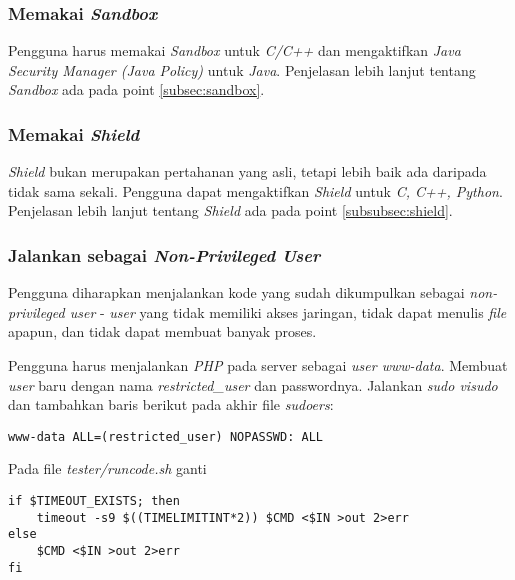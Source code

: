 \subsubsection{Memakai \textit{Sandbox}}
\label{subsubsec:memakai_sandbox}
Pengguna harus memakai \textit{Sandbox} untuk \textit{C/C++} dan mengaktifkan \textit{Java Security Manager (Java Policy)} untuk \textit{Java}. Penjelasan lebih lanjut tentang \textit{Sandbox} ada pada point \ref{subsec:sandbox}.

\subsubsection{Memakai \textit{Shield}}
\label{subsubsec:memakai_shield}
\textit{Shield} bukan merupakan pertahanan yang asli, tetapi lebih baik ada daripada tidak sama sekali. Pengguna dapat mengaktifkan \textit{Shield} untuk \textit{C, C++, Python}. Penjelasan lebih lanjut tentang \textit{Shield} ada pada point \ref{subsubsec:shield}.

\subsubsection{Jalankan sebagai \textit{Non-Privileged User}}
\label{subsubsec:non_prileged_user}
Pengguna diharapkan menjalankan kode yang sudah dikumpulkan sebagai \textit{non-privileged user} - \textit{user} yang tidak memiliki akses jaringan, tidak dapat menulis \textit{file} apapun, dan tidak dapat membuat banyak proses.

Pengguna harus menjalankan \textit{PHP} pada server sebagai \textit{user www-data}. Membuat \textit{user} baru dengan nama \textit{restricted\_user} dan passwordnya. Jalankan \textit{sudo visudo} dan tambahkan baris berikut pada akhir file \textit{sudoers}:

\begin{lstlisting}[basicstyle=\ttfamily, frame=single,
columns=fullflexible, keepspaces=true, breaklines=true, label=ls:13]
www-data ALL=(restricted_user) NOPASSWD: ALL
\end{lstlisting}

Pada file \textit{tester/runcode.sh} ganti 

\begin{lstlisting}[basicstyle=\ttfamily, frame=single,
columns=fullflexible, keepspaces=true, breaklines=true, label=ls:14]
if $TIMEOUT_EXISTS; then
	timeout -s9 $((TIMELIMITINT*2)) $CMD <$IN >out 2>err
else
	$CMD <$IN >out 2>err        
fi
\end{lstlisting}

